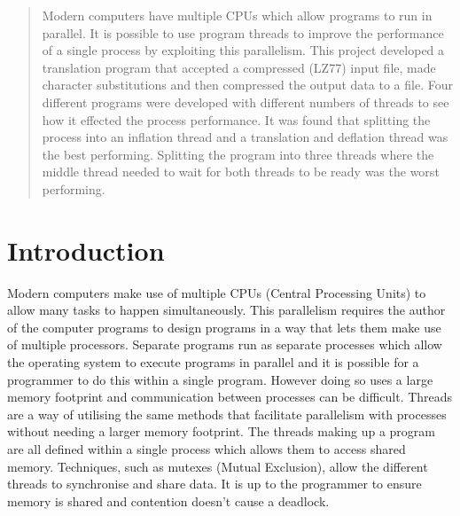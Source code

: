 \documentclass[a4paper,12pt]{article}
\begin{document}


\newpage


\begin{abstract}
Modern computers have multiple CPUs which allow programs to run in parallel.
It is possible to use program threads to improve the performance of a single process by exploiting this parallelism.
This project developed a translation program that accepted a compressed (LZ77) input file, made character substitutions and then compressed the output data to a file.
Four different programs were developed with different numbers of threads to see how it effected the process performance.
It was found that splitting the process into an inflation thread and a translation and deflation thread was the best performing.
Splitting the program into three threads where the middle thread needed to wait for both threads to be ready was the worst performing.
\end{abstract}
\newpage

\tableofcontents
\newpage


%
%
\section{Introduction}
Modern computers make use of multiple CPUs (Central Processing Units) to allow many tasks to happen simultaneously.
This parallelism requires the author of the computer programs to design programs in a way that lets them make use of multiple processors.
Separate programs run as separate processes which allow the operating system to execute programs in parallel and it is possible for a programmer to do this within a single program.
However doing so uses a large memory footprint and communication between processes can be difficult.
Threads are a way of utilising the same methods that facilitate parallelism with processes without needing a larger memory footprint.
The threads making up a program are all defined within a single process which allows them to access shared memory.
Techniques, such as mutexes (Mutual Exclusion), allow the different threads to synchronise and share data.
It is up to the programmer to ensure memory is shared and contention doesn't cause a deadlock.
\end{document}
